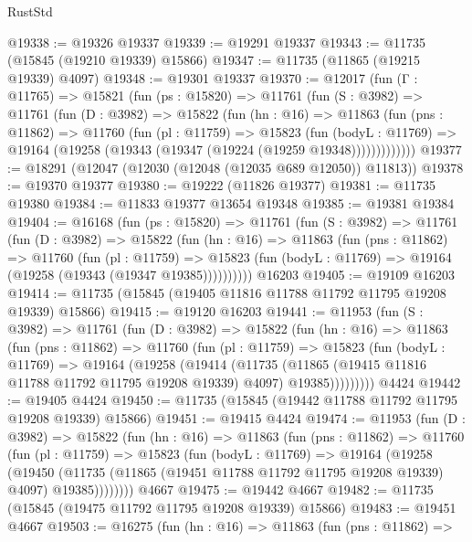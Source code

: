 \begin{lexlean}{RustStd}
\begin{coremodule}
@19338 := @19326 @19337
@19339 := @19291 @19337
@19343 := @11735 (@15845 (@19210 @19339) @15866)
@19347 := @11735 (@11865 (@19215 @19339) @4097)
@19348 := @19301 @19337
@19370 := @12017
    (fun (Γ : @11765) =>
    @15821
      (fun (ps : @15820) =>
      @11761
        (fun (S : @3982) =>
        @11761
          (fun (D : @3982) =>
          @15822
            (fun (hn : @16) =>
            @11863
              (fun (pns : @11862) =>
              @11760
                (fun (pl : @11759) =>
                @15823
                  (fun (bodyL : @11769) =>
                  @19164 (@19258 (@19343 (@19347 (@19224 (@19259 @19348)))))))))))))
@19377 := @18291 (@12047 (@12030 (@12048 (@12035 @689 @12050)) @11813))
@19378 := @19370 @19377
@19380 := @19222 (@11826 @19377)
@19381 := @11735 @19380
@19384 := @11833 @19377 @13654 @19348
@19385 := @19381 @19384
@19404 := @16168
    (fun (ps : @15820) =>
    @11761
      (fun (S : @3982) =>
      @11761
        (fun (D : @3982) =>
        @15822
          (fun (hn : @16) =>
          @11863
            (fun (pns : @11862) =>
            @11760
              (fun (pl : @11759) =>
              @15823 (fun (bodyL : @11769) => @19164 (@19258 (@19343 (@19347 @19385))))))))))
    @16203
@19405 := @19109 @16203
@19414 := @11735 (@15845 (@19405 @11816 @11788 @11792 @11795 @19208 @19339) @15866)
@19415 := @19120 @16203
@19441 := @11953
    (fun (S : @3982) =>
    @11761
      (fun (D : @3982) =>
      @15822
        (fun (hn : @16) =>
        @11863
          (fun (pns : @11862) =>
          @11760
            (fun (pl : @11759) =>
            @15823
              (fun (bodyL : @11769) =>
              @19164
                (@19258
                  (@19414
                    (@11735
                      (@11865 (@19415 @11816 @11788 @11792 @11795 @19208 @19339) @4097)
                      @19385)))))))))
    @4424
@19442 := @19405 @4424
@19450 := @11735 (@15845 (@19442 @11788 @11792 @11795 @19208 @19339) @15866)
@19451 := @19415 @4424
@19474 := @11953
    (fun (D : @3982) =>
    @15822
      (fun (hn : @16) =>
      @11863
        (fun (pns : @11862) =>
        @11760
          (fun (pl : @11759) =>
          @15823
            (fun (bodyL : @11769) =>
            @19164
              (@19258
                (@19450
                  (@11735 (@11865 (@19451 @11788 @11792 @11795 @19208 @19339) @4097) @19385))))))))
    @4667
@19475 := @19442 @4667
@19482 := @11735 (@15845 (@19475 @11792 @11795 @19208 @19339) @15866)
@19483 := @19451 @4667
@19503 := @16275
    (fun (hn : @16) =>
    @11863
      (fun (pns : @11862) =>

\end{coremodule}
\end{lexlean}
